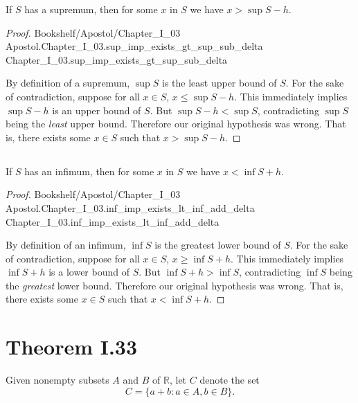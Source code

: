 \documentclass{article}
\newcommand{\link}[1]{\lean{../..}
  {Bookshelf/Apostol/Chapter\_I\_03} %
  {Apostol.Chapter\_I\_03.#1} %
  {Chapter\_I\_03.#1} %
}
\begin{document}
If $S$ has a supremum, then for some $x$ in $S$ we have $x > \sup{S} - h$.

\begin{proof}

  \link{sup\_imp\_exists\_gt\_sup\_sub\_delta}

  \divider

  By definition of a supremum, $\sup{S}$ is the least upper bound of $S$.
  For the sake of contradiction, suppose for all $x \in S$,
    $x \leq \sup{S} - h$.
  This immediately implies $\sup{S} - h$ is an upper bound of $S$.
  But $\sup{S} - h < \sup{S}$, contradicting $\sup{S}$ being the \textit{least}
    upper bound.
  Therefore our original hypothesis was wrong.
  That is, there exists some $x \in S$ such that $x > \sup{S} - h$.

\end{proof}

\subsection*{}%
%

If $S$ has an infimum, then for some $x$ in $S$ we have $x < \inf{S} + h$.

\begin{proof}

  \link{inf\_imp\_exists\_lt\_inf\_add\_delta}

  \divider

  By definition of an infimum, $\inf{S}$ is the greatest lower bound of $S$.
  For the sake of contradiction, suppose for all $x \in S$,
    $x \geq \inf{S} + h$.
  This immediately implies $\inf{S} + h$ is a lower bound of $S$.
  But $\inf{S} + h > \inf{S}$, contradicting $\inf{S}$ being the
    \textit{greatest} lower bound.
  Therefore our original hypothesis was wrong.
  That is, there exists some $x \in S$ such that $x < \inf{S} + h$.

\end{proof}

\section*{Theorem I.33}%
%

Given nonempty subsets $A$ and $B$ of $\mathbb{R}$, let $C$ denote the set
  $$C = \{a + b : a \in A, b \in B\}.$$

\end{document}
